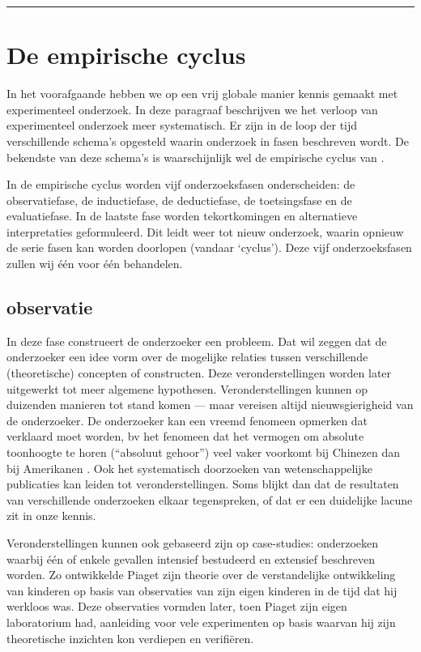 \documentclass[
]{book}
\begin{document}
\begin{center}\rule{0.5\linewidth}{0.5pt}\end{center}

\hypertarget{sec:empirischecyclus}{%
\section{De empirische cyclus}\label{sec:empirischecyclus}}

In het voorafgaande hebben we op een vrij
globale manier kennis gemaakt met experimenteel onderzoek. In deze
paragraaf beschrijven we het verloop van experimenteel onderzoek meer
systematisch. Er zijn in de loop der tijd verschillende schema's
opgesteld waarin onderzoek in fasen beschreven wordt. De bekendste van
deze schema's is waarschijnlijk wel de empirische cyclus van \citep{Groot61}.

In de empirische cyclus worden vijf onderzoeksfasen onderscheiden: de
observatiefase, de inductiefase, de deductiefase, de toetsingsfase en de
evaluatiefase. In de laatste fase worden tekortkomingen en alternatieve
interpretaties geformuleerd. Dit leidt weer tot nieuw onderzoek, waarin
opnieuw de serie fasen kan worden doorlopen (vandaar `cyclus'). Deze
vijf onderzoeksfasen zullen wij één voor één behandelen.

\hypertarget{observatie}{%
\subsection{observatie}\label{observatie}}

In deze fase construeert de onderzoeker een probleem. Dat wil zeggen dat
de onderzoeker een idee vorm over de mogelijke relaties tussen
verschillende (theoretische) concepten of constructen. Deze
veronderstellingen worden later uitgewerkt tot meer algemene hypothesen.
Veronderstellingen kunnen op duizenden manieren tot stand komen --- maar
vereisen altijd nieuwsgierigheid van de onderzoeker. De onderzoeker kan
een vreemd fenomeen opmerken dat verklaard moet worden, bv het fenomeen
dat het vermogen om absolute toonhoogte te horen (``absoluut gehoor'')
veel vaker voorkomt bij Chinezen dan bij Amerikanen \citep{Deut06}. Ook het
systematisch doorzoeken van wetenschappelijke publicaties kan leiden tot
veronderstellingen. Soms blijkt dan dat de resultaten van verschillende
onderzoeken elkaar tegenspreken, of dat er een duidelijke lacune zit in
onze kennis.

Veronderstellingen kunnen ook gebaseerd zijn op case-studies:
onderzoeken waarbij één of enkele gevallen intensief bestudeerd en
extensief beschreven worden. Zo ontwikkelde Piaget zijn theorie over de
verstandelijke ontwikkeling van kinderen op basis van observaties van
zijn eigen kinderen in de tijd dat hij werkloos was. Deze observaties
vormden later, toen Piaget zijn eigen laboratorium had, aanleiding voor
vele experimenten op basis waarvan hij zijn theoretische inzichten kon
verdiepen en verifiëren.
\end{document}
